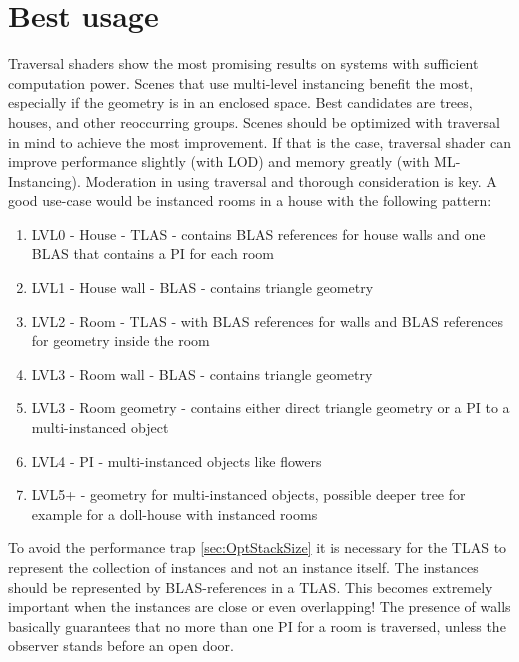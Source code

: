 \section{Best usage}
\label{sec:BestUsage}
Traversal shaders show the most promising results on systems with sufficient computation power. Scenes that use multi-level instancing benefit the most, especially if the geometry is in an enclosed space. Best candidates are trees, houses, and other reoccurring groups. Scenes should be optimized with traversal in mind to achieve the most improvement. If that is the case, traversal shader can improve performance slightly (with LOD) and memory greatly (with ML-Instancing). Moderation in using traversal and thorough consideration is key.
A good use-case would be instanced rooms in a house with the following pattern:
\begin{enumerate}
    \item LVL0 - House - TLAS - contains BLAS references for house walls and one BLAS that contains a PI for each room
    \item LVL1 - House wall - BLAS - contains triangle geometry
    \item LVL2 - Room - TLAS - with BLAS references for walls and BLAS references for geometry inside the room
    \item LVL3 - Room wall - BLAS - contains triangle geometry
    \item LVL3 - Room geometry - contains either direct triangle geometry or a PI to a multi-instanced object
    \item LVL4 - PI - multi-instanced objects like flowers
    \item LVL5+ - geometry for multi-instanced objects, possible deeper tree for example for a doll-house with instanced rooms
\end{enumerate}
To avoid the performance trap \ref{sec:OptStackSize} it is necessary for the TLAS to represent the collection of instances and not an instance itself. The instances should be represented by BLAS-references in a TLAS. This becomes extremely important when the instances are close or even overlapping! The presence of walls basically guarantees that no more than one PI for a room is traversed, unless the observer stands before an open door.
